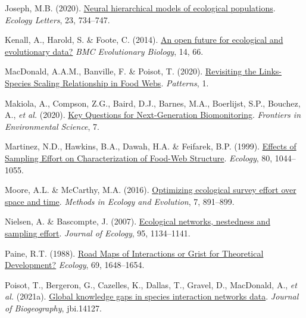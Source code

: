 \documentclass[11pt]{article}
\newlength{\cslhangindent}
\newenvironment{CSLReferences}[3] %
 {%
  \setlength{\parindent}{0pt}
  \ifodd #1 \everypar{\setlength{\hangindent}{\cslhangindent}}\ignorespaces\fi
  \ifnum #2 > 0
  \setlength{\parskip}{#2\baselineskip}
  \fi
 }%
 {}
\begin{document}
\begin{CSLReferences}{1}{0}
\leavevmode{}%
Joseph, M.B. (2020). \href{https://doi.org/10.1111/ele.13462}{Neural
hierarchical models of ecological populations}. \emph{Ecology Letters},
23, 734--747.

\leavevmode{}%
Kenall, A., Harold, S. \& Foote, C. (2014).
\href{https://doi.org/10.1186/1471-2148-14-66}{An open future for
ecological and evolutionary data?} \emph{BMC Evolutionary Biology}, 14,
66.

\leavevmode{}%
MacDonald, A.A.M., Banville, F. \& Poisot, T. (2020).
\href{https://doi.org/10.1016/j.patter.2020.100079}{Revisiting the
Links-Species Scaling Relationship in Food Webs}. \emph{Patterns}, 1.

\leavevmode{}%
Makiola, A., Compson, Z.G., Baird, D.J., Barnes, M.A., Boerlijst, S.P.,
Bouchez, A., \emph{et al.} (2020).
\href{https://doi.org/10.3389/fenvs.2019.00197}{Key Questions for
Next-Generation Biomonitoring}. \emph{Frontiers in Environmental
Science}, 7.

\leavevmode{}%
Martinez, N.D., Hawkins, B.A., Dawah, H.A. \& Feifarek, B.P. (1999).
\href{https://doi.org/10.1890/0012-9658(1999)080\%5B1044:EOSEOC\%5D2.0.CO;2}{Effects
of Sampling Effort on Characterization of Food-Web Structure}.
\emph{Ecology}, 80, 1044--1055.

\leavevmode{}%
Moore, A.L. \& McCarthy, M.A. (2016).
\href{https://doi.org/10.1111/2041-210X.12564}{Optimizing ecological
survey effort over space and time}. \emph{Methods in Ecology and
Evolution}, 7, 891--899.

\leavevmode{}%
Nielsen, A. \& Bascompte, J. (2007).
\href{https://doi.org/10.1111/j.1365-2745.2007.01271.x}{Ecological
networks, nestedness and sampling effort}. \emph{Journal of Ecology},
95, 1134--1141.

\leavevmode{}%
Paine, R.T. (1988). \href{https://doi.org/10.2307/1941141}{Road Maps of
Interactions or Grist for Theoretical Development?} \emph{Ecology}, 69,
1648--1654.

\leavevmode{}%
Poisot, T., Bergeron, G., Cazelles, K., Dallas, T., Gravel, D.,
MacDonald, A., \emph{et al.} (2021a).
\href{https://doi.org/10.1111/jbi.14127}{Global knowledge gaps in
species interaction networks data}. \emph{Journal of Biogeography},
jbi.14127.


\end{CSLReferences}
\end{document}
